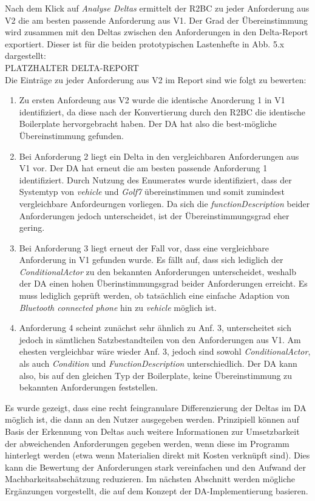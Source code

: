 \documentclass[12pt]{report}
\begin{document}
Nach dem Klick auf \textit{Analyse Deltas} ermittelt der R2BC zu jeder Anforderung aus V2 die am besten passende Anforderung aus V1. Der Grad der Übereinstimmung wird zusammen mit den Deltas zwischen den Anforderungen in den Delta-Report exportiert. Dieser ist für die beiden prototypischen Lastenhefte in Abb. 5.x dargestellt:
\\
PLATZHALTER DELTA-REPORT
\\
Die Einträge zu jeder Anforderung aus V2 im Report sind wie folgt zu bewerten:
\begin{enumerate}
\item Zu ersten Anfordeung aus V2 wurde die identische Anorderung 1 in V1 identifiziert, da diese nach der Konvertierung durch den R2BC die identische Boilerplate hervorgebracht haben. Der DA hat also die best-mögliche Übereinstimmung gefunden.
\item Bei Anforderung 2 liegt ein Delta in den vergleichbaren Anforderungen aus V1 vor. Der DA hat erneut die am besten passende Anforderung 1 identifiziert. Durch Nutzung des Enumerates wurde identifiziert, dass der Systemtyp von \textit{vehicle} und \textit{Golf7} übereinstimmen und somit zumindest vergleichbare Anfordeurngen vorliegen. Da sich die \textit{functionDescription} beider Anforderungen jedoch unterscheidet, ist der Übereinstimmungsgrad eher gering.
\item Bei Anforderung 3 liegt erneut der Fall vor, dass eine vergleichbare Anforderung in V1 gefunden wurde. Es fällt auf, dass sich lediglich der \textit{ConditionalActor} zu den bekannten Anforderungen unterscheidet, weshalb der DA einen hohen Überinstimmungsgrad beider Anforderungen erreicht. Es muss lediglich geprüft werden, ob tatsächlich eine einfache Adaption von \textit{Bluetooth connected phone} hin zu \textit{vehicle} möglich ist.
\item Anforderung 4 scheint zunächst sehr ähnlich zu Anf. 3, unterscheitet sich jedoch in sämtlichen Satzbestandteilen von den Anforderungen aus V1. Am ehesten vergleichbar wäre wieder Anf. 3, jedoch sind sowohl \textit{ConditionalActor}, als auch \textit{Condition} und \textit{FunctionDescription} unterschiedlich. Der DA kann also, bis auf den gleichen Typ der Boilerplate, keine Übereinstimmung zu bekannten Anforderungen feststellen.
\end{enumerate}

Es wurde gezeigt, dass eine recht feingranulare Differenzierung der Deltas im DA möglich ist, die dann an den Nutzer ausgegeben werden. Prinzipiell können auf Basis der Erkennung von Deltas auch weitere Informationen zur Umsetzbarkeit der abweichenden Anforderungen gegeben werden, wenn diese im Programm hinterlegt werden (etwa wenn Materialien direkt mit Kosten verknüpft sind). 
Dies kann die Bewertung der Anforderungen stark vereinfachen und den Aufwand der Machbarkeitsabschätzung reduzieren.
Im nächsten Abschnitt werden mögliche Ergänzungen vorgestellt, die auf dem Konzept der DA-Implementierung basieren. 
\end{document}
